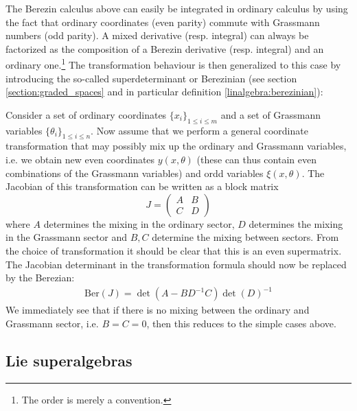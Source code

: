     The Berezin calculus above can easily be integrated in ordinary calculus by using the fact that ordinary coordinates (even parity) commute with Grassmann numbers (odd parity). A mixed derivative (resp. integral) can always be factorized as the composition of a Berezin derivative (resp. integral) and an ordinary one.\footnote{The order is merely a convention.} The transformation behaviour is then generalized to this case by introducing the so-called superdeterminant or Berezinian (see section \ref{section:graded_spaces} and in particular definition \ref{linalgebra:berezinian}):

    \qquad Consider a set of ordinary coordinates $\{x_i\}_{1\leq i\leq m}$ and a set of Grassmann variables $\{\theta_i\}_{1\leq i\leq n}$. Now assume that we perform a general coordinate transformation that may possibly mix up the ordinary and Grassmann variables, i.e. we obtain new even coordinates $y(x, \theta)$ (these can thus contain even combinations of the Grassmann variables) and ordd variables $\xi(x, \theta)$. The Jacobian of this transformation can be written as a block matrix \[J=\begin{pmatrix}A&B\\C&D\end{pmatrix}\] where $A$ determines the mixing in the ordinary sector, $D$ determines the mixing in the Grassmann sector and $B, C$ determine the mixing between sectors. From the choice of transformation it should be clear that this is an even supermatrix. The Jacobian determinant in the transformation formula should now be replaced by the Berezian:
    \begin{gather}
        \text{Ber}(J) = \det(A - BD^{-1}C)\det(D)^{-1}
    \end{gather}
    We immediately see that if there is no mixing between the ordinary and Grassmann sector, i.e. $B=C=0$, then this reduces to the simple cases above.

\subsection{Lie superalgebras}

